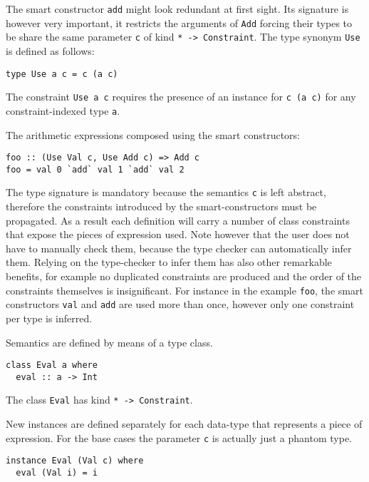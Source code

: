 \documentclass[../Thesis.tex]{subfiles}
\begin{document}
The smart constructor \texttt{add} might look redundant at first sight.
Its signature is however very important, it restricts the arguments of 
\texttt{Add} forcing their types to be share the same parameter \texttt{c}
of kind \texttt{* -> Constraint}.
The type synonym \texttt{Use} is defined as follows:

\begin{verbatim}
type Use a c = c (a c)
\end{verbatim}

The constraint \texttt{Use a c} requires the presence of an instance for \texttt{c (a c)} for any constraint-indexed type \texttt{a}.

The arithmetic expressions composed using the smart constructors:

\begin{verbatim}
foo :: (Use Val c, Use Add c) => Add c
foo = val 0 `add` val 1 `add` val 2
\end{verbatim}

The type signature is mandatory because the semantics \texttt{c} is left
abstract, therefore the constraints introduced by the smart-constructors must be propagated. As a result each definition will carry a number of class constraints that expose the pieces of expression used.
Note however that the user does not have to manually check them, because
the type checker can automatically infer them. Relying on the type-checker to infer them has also other remarkable benefits, for example no duplicated constraints are produced and the order of the constraints themselves is insignificant.
For instance in the example \texttt{foo}, the smart constructors \texttt{val} and \texttt{add} are used more than once, however only one constraint per type is inferred. 

Semantics are defined by means of a type class.

\begin{verbatim}
class Eval a where
  eval :: a -> Int
\end{verbatim}

The class \texttt{Eval} has kind \texttt{* -> Constraint}.

New instances are defined separately for each data-type that represents a
piece of expression. For the base cases the parameter \texttt{c} is actually just a phantom type.

\begin{verbatim}
instance Eval (Val c) where
  eval (Val i) = i
\end{verbatim}
\end{document}
